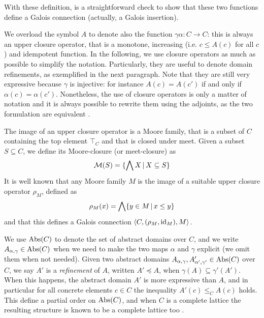 \begin{example}[Intervals]
	With these definition, is a straightforward check to show that these two functions define a Galois connection (actually, a Galois insertion).
\end{example}

We overload the symbol $A$ to denote also the function $\gamma \alpha: C \rightarrow C$: this is always an upper closure operator, that is a monotone, increasing (i.e. $c \le A(c)$ for all $c$) and idempotent function. In the following, we use closure operators as much as possible to simplify the notation. Particularly, they are useful to denote domain refinements, as exemplified in the next paragraph.
Note that they are still very expressive because $\gamma$ is injective: for instance $A(c) = A(c')$ if and only if $\alpha(c) = \alpha(c')$. Nonetheless, the use of closure operators is only a matter of notation and it is always possible to rewrite them using the adjoints, as the two formulation are equivalent \cite{CC79}.

The image of an upper closure operator is a Moore family, that is a subset of $C$ containing the top element $\top_C$ and that is closed under meet. Given a subset $S \subseteq C$, we define its Moore-closure (or meet-closure) as
\[
\mathcal{M}(S) = \{ \bigwedge X \,\vert\, X \subseteq S \}
\]
It is well known that any Moore family $M$ is the image of a suitable upper closure operator $\rho_M$, defined as
\[
\rho_M(x) = \bigwedge \{ y \in M \,\vert\, x \le y \}
\]
and that this defines a Galois connection $\langle C, (\rho_M, \text{id}_M), M \rangle$.

We use $\text{\normalfont Abs}(C)$ to denote the set of abstract domains over $C$, and we write $A_{\alpha, \gamma} \in \text{\normalfont Abs}(C)$ when we need to make the two maps $\alpha$ and $\gamma$ explicit (we omit them when not needed).
Given two abstract domains $A_{\alpha, \gamma}, A'_{\alpha', \gamma'} \in \text{\normalfont Abs}(C)$ over $C$, we say $A'$ is a \emph{refinement} of $A$, written $A' \preceq A$, when $\gamma(A) \subseteq \gamma'(A')$. When this happens, the abstract domain $A'$ is more expressive than $A$, and in particular for all concrete elements $c \in C$ the inequality $A'(c) \le_C A(c)$ holds. This define a partial order on $\text{\normalfont Abs}(C)$, and when $C$ is a complete lattice the resulting structure is known to be a complete lattice too \cite{CC79}.

